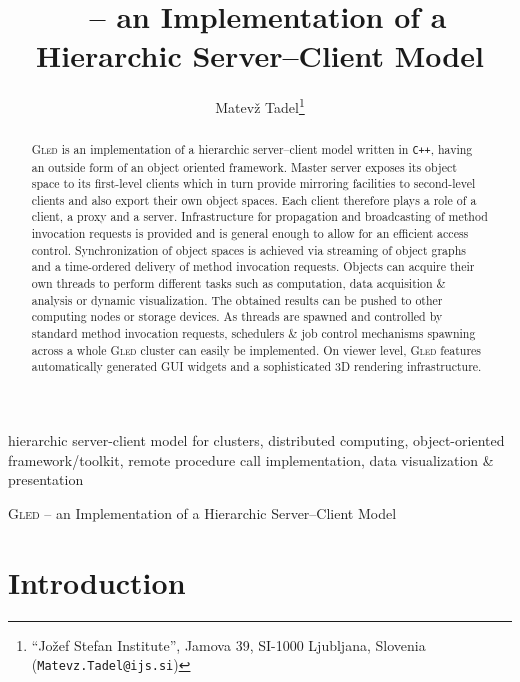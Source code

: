 \documentclass[final]{siamltex}
\title{\gled\ -- an Implementation of a Hierarchic Server--Client Model}
\author{Matev\v{z} Tadel\thanks{``Jo\v{z}ef Stefan Institute'', Jamova 39,
    SI-1000 Ljubljana,
    Slovenia ({\tt Matevz.Tadel@ijs.si})}}
\def\gled{\textsc{Gled}\xspace}
\def\smalltt#1{{\small\texttt{#1}}}
\begin{document}
\maketitle

\begin{abstract}
  \gled is an implementation of a hierarchic server--client model
  written in \smalltt{C++}, having an outside form of an object
  oriented framework. Master server exposes its object space to its
  first-level clients which in turn provide mirroring facilities to
  second-level clients and also export their own object spaces. Each
  client therefore plays a role of a client, a proxy and a server.
  Infrastructure for propagation and broadcasting of method invocation
  requests is provided and is general enough to allow for an efficient
  access control. Synchronization of object spaces is achieved via
  streaming of object graphs and a time-ordered delivery of method
  invocation requests.
%
  Objects can acquire their own threads to perform different tasks
  such as computation, data acquisition \& analysis or dynamic
  visualization. The obtained results can be pushed to other computing
  nodes or storage devices. As threads are spawned and controlled
  by standard method invocation requests, schedulers \& job control
  mechanisms spawning across a whole \gled cluster can easily be
  implemented.
%
  On viewer level, \gled features automatically generated GUI widgets
  and a sophisticated 3D rendering infrastructure.
\end{abstract}

\begin{keywords} 
  hierarchic server-client model for clusters,
  distributed computing,
  object-oriented framework/toolkit,
  remote procedure call implementation,
  data visualization \& presentation
\end{keywords}

\pagestyle{myheadings}
\thispagestyle{plain}
{\textsc{Gled} -- an Implementation of a Hierarchic Server--Client Model}

\section{Introduction}
\end{document}
